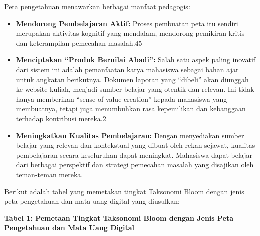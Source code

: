 \documentclass[
  letterpaper,
  DIV=11,
  numbers=noendperiod]{scrreprt}
\begin{document}
Peta pengetahuan menawarkan berbagai manfaat pedagogis:

\begin{itemize}
\item
  \textbf{Mendorong Pembelajaran Aktif:} Proses pembuatan peta itu
  sendiri merupakan aktivitas kognitif yang mendalam, mendorong
  pemikiran kritis dan keterampilan pemecahan masalah.45
\item
  \textbf{Menciptakan ``Produk Bernilai Abadi'':} Salah satu aspek
  paling inovatif dari sistem ini adalah pemanfaatan karya mahasiswa
  sebagai bahan ajar untuk angkatan berikutnya. Dokumen laporan yang
  ``dibeli'' akan diunggah ke website kuliah, menjadi sumber belajar
  yang otentik dan relevan. Ini tidak hanya memberikan ``sense of value
  creation'' kepada mahasiswa yang membuatnya, tetapi juga menumbuhkan
  rasa kepemilikan dan kebanggaan terhadap kontribusi mereka.2
\item
  \textbf{Meningkatkan Kualitas Pembelajaran:} Dengan menyediakan sumber
  belajar yang relevan dan kontekstual yang dibuat oleh rekan sejawat,
  kualitas pembelajaran secara keseluruhan dapat meningkat. Mahasiswa
  dapat belajar dari berbagai perspektif dan strategi pemecahan masalah
  yang disajikan oleh teman-teman mereka.
\end{itemize}

Berikut adalah tabel yang memetakan tingkat Taksonomi Bloom dengan jenis
peta pengetahuan dan mata uang digital yang diusulkan:

\textbf{Tabel 1: Pemetaan Tingkat Taksonomi Bloom dengan Jenis Peta
Pengetahuan dan Mata Uang Digital}
\end{document}
